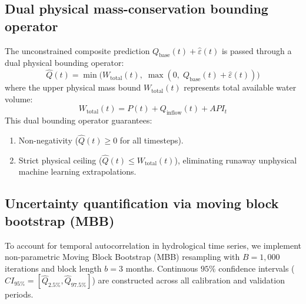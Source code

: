 \documentclass[11pt,a4paper,fleqn]{article}
\begin{document}
\subsection{Dual physical mass-conservation bounding operator}
The unconstrained composite prediction $Q_{\text{base}}(t) + \hat{\varepsilon}(t)$ is passed through a dual physical bounding operator:
\begin{equation}
\hat{Q}(t) = \min\Big(W_{\text{total}}(t), \; \max\left(0, \; Q_{\text{base}}(t) + \hat{\varepsilon}(t)\right)\Big)
\end{equation}
where the upper physical mass bound $W_{\text{total}}(t)$ represents total available water volume:
\begin{equation}
W_{\text{total}}(t) = P(t) + Q_{\text{inflow}}(t) + API_t
\end{equation}
This dual bounding operator guarantees:
\begin{enumerate}
    \item Non-negativity ($\hat{Q}(t) \ge 0$ for all timesteps).
    \item Strict physical ceiling ($\hat{Q}(t) \le W_{\text{total}}(t)$), eliminating runaway unphysical machine learning extrapolations.
\end{enumerate}

\subsection{Uncertainty quantification via moving block bootstrap (MBB)}
To account for temporal autocorrelation in hydrological time series, we implement non-parametric Moving Block Bootstrap (MBB) resampling with $B = 1,000$ iterations and block length $b = 3$ months. Continuous $95\%$ confidence intervals ($CI_{95\%} = [\hat{Q}_{2.5\%}, \hat{Q}_{97.5\%}]$) are constructed across all calibration and validation periods.
\end{document}
